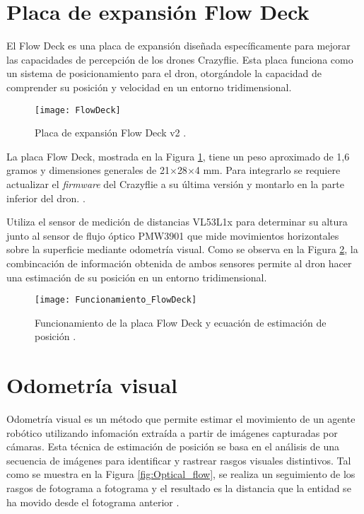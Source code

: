 \section{Placa de expansión Flow Deck}
El Flow Deck es una placa de expansión diseñada específicamente para mejorar las capacidades de percepción de los drones Crazyflie. Esta placa funciona como un sistema de posicionamiento para el dron, otorgándole la capacidad de comprender su posición y velocidad en un entorno tridimensional. 

\begin{figure}[htbp]
	\centering
	\texttt{[image: FlowDeck]}
	\caption{Placa de expansión Flow Deck v2 \cite{FlowDeck}.}
	\label{fig:FlowDeck}
\end{figure}

La placa Flow Deck, mostrada en la Figura \ref{fig:FlowDeck}, tiene un peso aproximado de 1,6 gramos y dimensiones generales de 21$\times$28$\times$4 mm. Para integrarlo se requiere actualizar el \textit{firmware} del Crazyflie a su última versión y montarlo en la parte inferior del dron. \cite{FlowDeck}. 

Utiliza el sensor de medición de distancias VL53L1x para determinar su altura junto al sensor de flujo óptico PMW3901 que mide movimientos horizontales sobre la superficie mediante odometría visual. Como se observa en la Figura \ref{fig:Funcionamiento_FlowDeck}, la combincación de información obtenida de ambos sensores permite al dron hacer una estimación de su posición en un entorno tridimensional.

\begin{figure}[htbp]
	\centering
	\texttt{[image: Funcionamiento\_FlowDeck]}
	\caption{Funcionamiento de la placa Flow Deck y ecuación de estimación de posición \cite{Funcionamiento_FlowDeck}.}
	\label{fig:Funcionamiento_FlowDeck}
\end{figure}

\section{Odometría visual}
Odometría visual es un método que permite estimar el movimiento de un agente robótico utilizando infomación extraída a partir de imágenes capturadas por cámaras. Esta técnica de estimación de posición se basa en el análisis de una secuencia de imágenes para identificar y rastrear rasgos visuales distintivos. Tal como se muestra en la Figura \ref{fig:Optical_flow}, se realiza un seguimiento de los rasgos de fotograma a fotograma y el resultado es la distancia que la entidad se ha movido desde el fotograma anterior \cite{Persson2022_book}.


